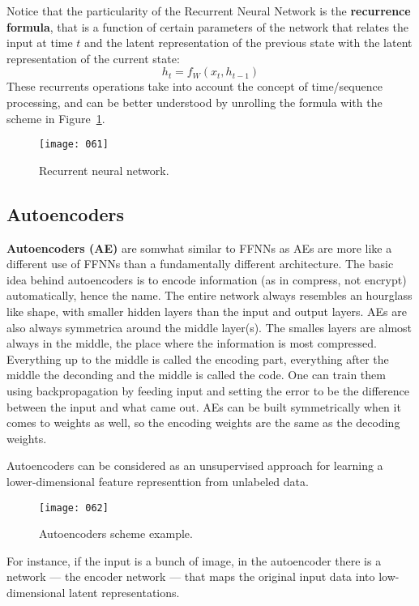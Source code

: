 Notice that the particularity of the Recurrent Neural Network is the \textbf{recurrence formula}, that is a function of certain parameters of the network that relates the input at time \(t\) and the latent representation of the previous state with the latent representation of the current state:
\begin{equation}
    h_t = f_W(x_t, h_{t-1})
\end{equation}
These recurrents operations take into account the concept of time/sequence processing, and can be better understood by unrolling the formula with the scheme in Figure~\ref{fig:061}. 
\begin{figure}[h!]
    \centering
    \texttt{[image: 061]}
    \caption{Recurrent neural network.}
    \label{fig:061}
\end{figure}

\subsection{Autoencoders}
\textbf{Autoencoders (AE)} are somwhat similar to FFNNs as AEs are more like a different use of FFNNs than a fundamentally different architecture. The basic idea behind autoencoders is to encode information (as in compress, not encrypt) automatically, hence the name. The entire network always resembles an hourglass like shape, with smaller hidden layers than the input and output layers. AEs are also always symmetrica around the middle layer(s). The smalles layers are almost always in the middle, the place where the information is most compressed. Everything up to the middle is called the encoding part, everything after the middle the deconding and the middle is called the code. One can train them using backpropagation by feeding input and setting the error to be the difference between the input and what came out. AEs can be built symmetrically when it comes to weights as well, so the encoding weights are the same as the decoding weights.

Autoencoders can be considered as an unsupervised approach for learning a lower-dimensional feature representtion from unlabeled data.

\begin{figure}[h!]
    \centering
    \texttt{[image: 062]}
    \caption{Autoencoders scheme example.}
    \label{fig:062}
\end{figure}

For instance, if the input is a bunch of image, in the autoencoder there is a network --- the encoder network --- that maps the original input data into low-dimensional latent representations.

